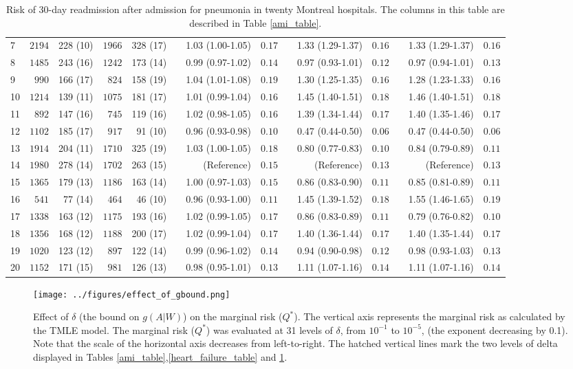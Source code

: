 \documentclass[]{article}\usepackage[]{graphicx}\usepackage[]{color}
\begin{document}
\begin{landscape}
\begin{table}[!tbp]
\begin{center}
\begin{tabular}{lrrrrcrrcrrcrr}
7&$2194$&228 (10)&$1966$&328 (17)&&1.03 (1.00-1.05)&$0.17$&&1.33 (1.29-1.37)&$0.16$&&1.33 (1.29-1.37)&$0.16$\tabularnewline
8&$1485$&243 (16)&$1242$&173 (14)&&0.99 (0.97-1.02)&$0.14$&&0.97 (0.93-1.01)&$0.12$&&0.97 (0.94-1.01)&$0.13$\tabularnewline
9&$ 990$&166 (17)&$ 824$&158 (19)&&1.04 (1.01-1.08)&$0.19$&&1.30 (1.25-1.35)&$0.16$&&1.28 (1.23-1.33)&$0.16$\tabularnewline
10&$1214$&139 (11)&$1075$&181 (17)&&1.01 (0.99-1.04)&$0.16$&&1.45 (1.40-1.51)&$0.18$&&1.46 (1.40-1.51)&$0.18$\tabularnewline
11&$ 892$&147 (16)&$ 745$&119 (16)&&1.02 (0.98-1.05)&$0.16$&&1.39 (1.34-1.44)&$0.17$&&1.40 (1.35-1.46)&$0.17$\tabularnewline
12&$1102$&185 (17)&$ 917$&91 (10)&&0.96 (0.93-0.98)&$0.10$&&0.47 (0.44-0.50)&$0.06$&&0.47 (0.44-0.50)&$0.06$\tabularnewline
13&$1914$&204 (11)&$1710$&325 (19)&&1.03 (1.00-1.05)&$0.18$&&0.80 (0.77-0.83)&$0.10$&&0.84 (0.79-0.89)&$0.11$\tabularnewline
14&$1980$&278 (14)&$1702$&263 (15)&&(Reference)&$0.15$&&(Reference)&$0.13$&&(Reference)&$0.13$\tabularnewline
15&$1365$&179 (13)&$1186$&163 (14)&&1.00 (0.97-1.03)&$0.15$&&0.86 (0.83-0.90)&$0.11$&&0.85 (0.81-0.89)&$0.11$\tabularnewline
16&$ 541$&77 (14)&$ 464$&46 (10)&&0.96 (0.93-1.00)&$0.11$&&1.45 (1.39-1.52)&$0.18$&&1.55 (1.46-1.65)&$0.19$\tabularnewline
17&$1338$&163 (12)&$1175$&193 (16)&&1.02 (0.99-1.05)&$0.17$&&0.86 (0.83-0.89)&$0.11$&&0.79 (0.76-0.82)&$0.10$\tabularnewline
18&$1356$&168 (12)&$1188$&200 (17)&&1.02 (0.99-1.04)&$0.17$&&1.40 (1.36-1.44)&$0.17$&&1.40 (1.35-1.44)&$0.17$\tabularnewline
19&$1020$&123 (12)&$ 897$&122 (14)&&0.99 (0.96-1.02)&$0.14$&&0.94 (0.90-0.98)&$0.12$&&0.98 (0.93-1.03)&$0.13$\tabularnewline
20&$1152$&171 (15)&$ 981$&126 (13)&&0.98 (0.95-1.01)&$0.13$&&1.11 (1.07-1.16)&$0.14$&&1.11 (1.07-1.16)&$0.14$\tabularnewline
\hline
\end{tabular}

\caption{Risk of 30-day readmission after admission for  pneumonia  in twenty Montreal hospitals.  The columns in this table are described in Table \ref{ami_table}.\label{pneumonia_table}}\end{center}

\end{table}

\end{landscape}
\begin{figure}[]
    \centerline{
      \texttt{[image: ../figures/effect\_of\_gbound.png]}
    }
    \caption[Effect of $\delta$ (the bound on $g(A|W)$) on the marginal risk.]
      {Effect of $\delta$ (the bound on $g(A|W)$) on the marginal risk ($Q^*$). The vertical axis represents the marginal risk as calculated by the TMLE model. The marginal risk ($Q^*$) was evaluated at 31 levels of $\delta$, from $10^{-1}$ to $10^{-5}$, (the exponent decreasing by 0.1). Note that the scale of the horizontal axis decreases from left-to-right. The hatched vertical lines mark the two levels of delta displayed in Tables \ref{ami_table},\ref{heart_failure_table} and \ref{pneumonia_table}.}
    \label{fig:effect_of_gbound}
\end{figure}
\end{document}
